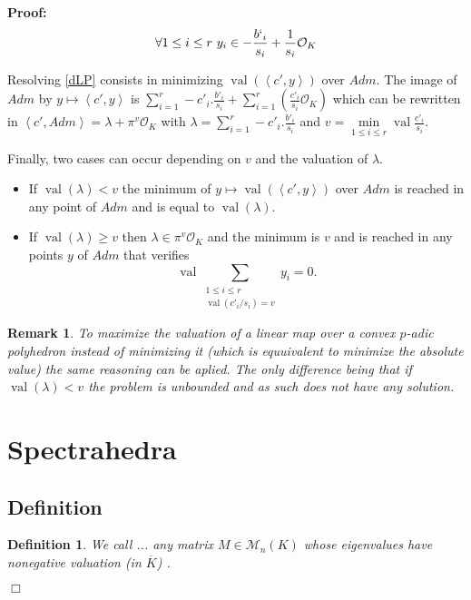 \documentclass[a4paper,12pt]{article}
\newenvironment{proof}{\hbox{}\vspace{-0.5cm} {\bf Proof:}}{\hfill $\Box$ \\}
\newtheorem{definition}{Definition}
\newtheorem{remark}{Remark}
\DeclareMathOperator{\val}{val}
\newcommand{\OK}{\mathcal{O}_K}
\begin{document}
\begin{proof}
\begin{equation}
	\forall 1 \le i\le r  \ y_i \in -\frac{b`_i}{s_i} + \frac{1}{s_i} \OK
\end{equation}


Resolving \ref{dLP} consists in minimizing $\val\left(\left<c',y \right>\right)$ over $Adm$. The image of $Adm$ by $y \mapsto \left<c',y \right>$ is $\sum_{i=1}^r -c'_i.\frac{b'_i}{s_i} + \sum_{i=1}^r\left( \frac{c'_i}{s_{i}} \OK \right)$ which can be rewritten in $\left<c',Adm \right> = \lambda + \pi^{v} \OK$ with $\lambda = \sum_{i=1}^r -c'_i.\frac{b'_i}{s_i}$ and $v = \min\limits_{1\le i\le r} \val \frac{c'_{i}}{s_{i}} $.

Finally, two cases can occur depending on $v$ and the valuation of $\lambda$.
\begin{itemize}
	\item If $\val( \lambda) < v$ the minimum of $y\mapsto \val\left(\left<c',y \right>\right)$ over $Adm$ is reached in any point of $Adm$ and is equal to $\val\left( \lambda\right)$.
	\item If $\val\left( \lambda \right) \ge v$ then $\lambda \in \pi^{v} \OK$ and the minimum is $v $ and is reached in any points $y$ of $Adm$ that verifies 
	\[\val \underset{ \begin{array}{c} 1\le i\le r\\ \val\left(c'_{i}/{s_{i}} \right) = v  \end{array}}{\sum} y_{i} = 0. \]
	
\end{itemize}
\begin{remark}
	To maximize the valuation of a linear map over a convex $p$-adic polyhedron instead of minimizing it (which is equuivalent to minimize the absolute value) the same reasoning can be aplied. The only difference being that if $\val\left( \lambda\right) < v$ the problem is unbounded and as such does not have any solution. 
\end{remark}




\section{Spectrahedra}

\subsection{Definition}
\newcommand\Mat{Positive semidefinite matrix }
\newcommand\mats{positive semidefinite matrices }
\newcommand\Mats{positive semidefinite matrices }
\begin{definition}
	We call ... any matrix $M \in \mathcal{M}_n\left( K \right) $ whose eigenvalues have nonegative valuation (in $\overline{K}$) .
	

\end{definition}
\end{proof}
\end{document}
